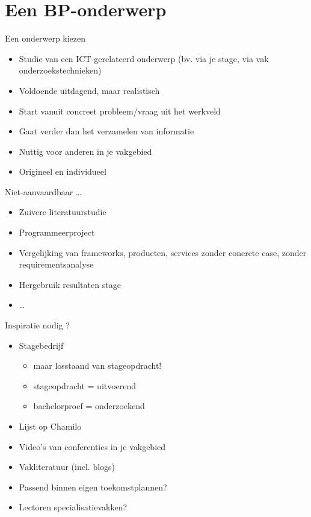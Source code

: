 \documentclass{beamer}
\begin{document}
\section{Een BP-onderwerp}
\sectionframe{}
\begin{frame}{Een onderwerp kiezen}
	\begin{itemize}
		\item Studie van een ICT-gerelateerd onderwerp (bv. via je stage, via vak onderzoekstechnieken)
		\item Voldoende uitdagend, maar realistisch
		\item Start vanuit concreet probleem/vraag uit het werkveld
		\item Gaat verder dan het verzamelen van informatie
		\item Nuttig voor anderen in je vakgebied
		\item Origineel en individueel
	\end{itemize}
\end{frame}

\begin{frame}{Niet-aanvaardbaar \dots}
	\begin{itemize}
		\item Zuivere literatuurstudie
		\item Programmeerproject
		\item Vergelijking van frameworks, producten, services zonder
		concrete case, zonder requirementsanalyse
		\item  Hergebruik resultaten stage
		\item  \dots
	\end{itemize}
\end{frame}

\begin{frame}{Inspiratie nodig ?}
	\begin{itemize}
		\item Stagebedrijf
		\begin{itemize}
		\item maar losstaand van stageopdracht!
		\item stageopdracht = uitvoerend
		\item bachelorproef = onderzoekend
	\end{itemize}
		\item Lijst op Chamilo
		\item Video's van conferenties in je vakgebied
		\item Vakliteratuur (incl. blogs)
		\item Passend binnen eigen toekomstplannen?
		\item Lectoren specialisatievakken?
	\end{itemize}
\end{frame}
\end{document}
